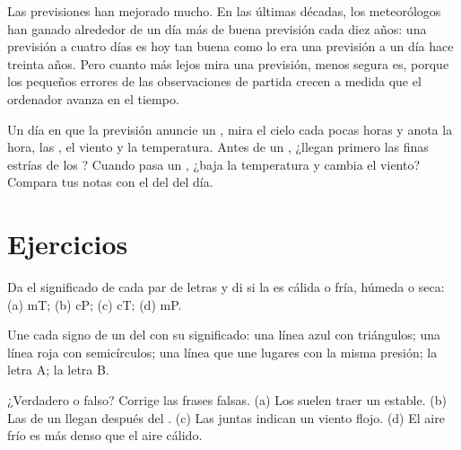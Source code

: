 Las previsiones han mejorado mucho. En las últimas décadas, los
meteorólogos han ganado alrededor de un día más de buena previsión cada
diez años: una previsión a cuatro días es hoy tan buena como lo era una
previsión a un día hace treinta años. Pero cuanto más lejos mira una
previsión, menos segura es, porque los pequeños errores de las
observaciones de partida crecen a medida que el ordenador avanza en el
tiempo.

\begin{inthefield}
Un día en que la previsión anuncie un , mira el cielo cada pocas
horas y anota la hora, las , el viento y la temperatura. Antes de un
, ¿llegan primero las finas estrías de los ? Cuando pasa
un , ¿baja la temperatura y cambia el viento? Compara tus notas
con el  del  del día.
\end{inthefield}

\section{Ejercicios}

\begin{exercise}[$\star$]\label{exo:g8:fronts-and-weather-maps:1}
Da el significado de cada par de letras y di si la  es cálida
o fría, húmeda o seca: (a) mT; (b) cP; (c) cT; (d) mP.
\end{exercise}

\begin{exercise}[$\star$]\label{exo:g8:fronts-and-weather-maps:2}
Une cada signo de un  del  con su significado: una línea azul con
triángulos; una línea roja con semicírculos; una línea que une lugares con
la misma presión; la letra A; la letra B.
\end{exercise}

\begin{exercise}[$\star$]\label{exo:g8:fronts-and-weather-maps:3}
¿Verdadero o falso? Corrige las frases falsas. (a) Los  suelen
traer un  estable. (b) Las  de un  llegan después
del . (c) Las  juntas indican un viento flojo. (d) El aire
frío es más denso que el aire cálido.
\end{exercise}

